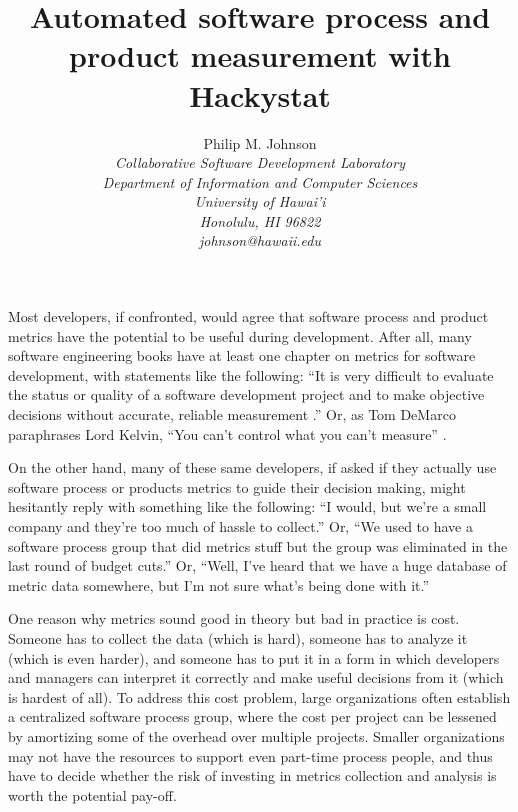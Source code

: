 \documentclass[12pt]{article}
\begin{document}
\title{Automated software process and product measurement with Hackystat}

\author{Philip M. Johnson \\
\em  Collaborative Software Development Laboratory \\
\em  Department of Information and Computer Sciences \\
\em  University of Hawai'i \\
\em  Honolulu, HI 96822 \\
\em  johnson@hawaii.edu \\
}
\maketitle
\thispagestyle{empty}


\label{sec:intro}

Most developers, if confronted, would agree that software process and
product metrics have the potential to be useful during development. After
all, many software engineering books have at least one chapter on
metrics for software development, with statements like the following: ``It
is very difficult to evaluate the status or quality of a software
development project and to make objective decisions without accurate,
reliable measurement \cite{Mayrhauser90}.''  Or, as Tom DeMarco 
paraphrases Lord Kelvin,  ``You can't control what you can't measure''
\cite{DeMarco82}.

On the other hand, many of these same developers, if asked if they actually
use software process or products metrics to guide their decision making,
might hesitantly reply with something like the following: ``I would, but
we're a small company and they're too much of hassle to collect.'' Or, ``We
used to have a software process group that did metrics stuff but the group
was eliminated in the last round of budget cuts.''  Or, ``Well, I've heard
that we have a huge database of metric data somewhere, but I'm not sure
what's being done with it.''

One reason why metrics sound good in theory but bad in practice is
cost.  Someone has to collect the data (which is hard), someone has to
analyze it (which is even harder), and someone has to put it in a form in
which developers and managers can interpret it correctly and make useful
decisions from it (which is hardest of all). To address this cost problem,
large organizations often establish a centralized software process group, where
the cost per project can be lessened by amortizing some of the overhead
over multiple projects. Smaller organizations may not have the resources to
support even part-time process people, and thus have to decide whether the
risk of investing in metrics collection and analysis is worth the potential
pay-off.
\end{document}
